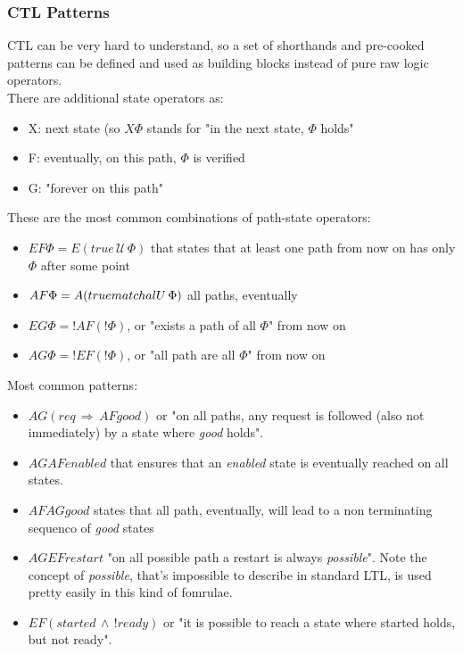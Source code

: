 \documentclass{article}
\begin{document}
				\subsubsection{CTL Patterns}
					CTL can be very hard to understand, so a set of shorthands and pre-cooked patterns can be defined and used as building blocks instead of pure raw logic operators.\\
					There are additional state operators as:
					\begin{itemize}
						\item X: next state (so $X\Phi$ stands for "in the next state, $\Phi$ holds"
						\item F: eventually, on this path, $\Phi$ is verified
						\item G: "forever on this path"
					\end{itemize}
					
					These are the most common combinations of path-state operators:
					\begin{itemize}
						\item $EF\Phi = E(true \,\mathcal{U}\, \Phi)$ that states that at least one path from now on has only $\Phi$ after some point
						\item $AF\Phi = A(true \,\\matchal{U}\, \Phi)$ all paths, eventually
						\item $EG\Phi = !AF(!\Phi)$, or "exists a path of all $\Phi$" from now on 
						\item $AG\Phi = !EF(!\Phi)$, or "all path are all $\Phi$" from now on
					\end{itemize}
					
					Most common patterns:
					\begin{itemize}
						\item $AG(req \,\Rightarrow\, AF good)$ or "on all paths, any request is followed (also not immediately) by a state where \emph{good} holds". 
						\item $AG AF enabled$ that ensures that an \emph{enabled} state is eventually reached on all states.
						\item $AF AG good$ states that all path, eventually, will lead to a non terminating sequenco of \emph{good} states
						\item $AG EF restart$ "on all possible path a restart is always \emph{possible}". Note the concept of \emph{possible}, that's impossible to describe in standard LTL, is used pretty easily in this kind of fomrulae.
						\item $EF(started \,\wedge\, !ready)$ or "it is possible to reach a state where started holds, but not ready". 
					\end{itemize}
					
\end{document}
